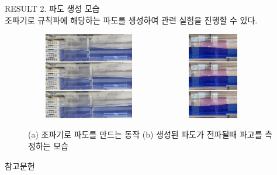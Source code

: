 \documentclass[a0paper,portrait]{Junlam_PosterP}
\begin{document}
\begin{poster}
\begin{posterbox}[name=result,column=2,below=wtank]{RESULT}
\small {2. 파도 생성 모습\\}
    \scriptsize{조파기로 규칙파에 해당하는 파도를 생성하여 관련 실험을 진행할 수 있다. }
\begin{figure}[H]
            \includegraphics[trim=0 0 0 0, clip, width=0.49\textwidth, 
                height=3.8cm,
                ]
                {images/vlcsnap-2023-06-29-10h35m08s932-1.png} 
            \includegraphics[trim=0 0 0 0, clip, width=0.49\textwidth, 
                height=3.8cm,
                ]
                {images/vlcsnap-2023-06-29-10h53m08s226-1.png} 
        \caption{(a) 조파기로 파도를 만드는 동작 (b) 생성된 파도가 전파될때 파고를 측정하는 모습}
        \label{result}   
    \end{figure}    
\end{posterbox}

\begin{posterbox}[name=refs,column=2,below=result,above=bottom]{참고문헌}
\tiny


\end{posterbox}

\end{poster}
\end{document}

